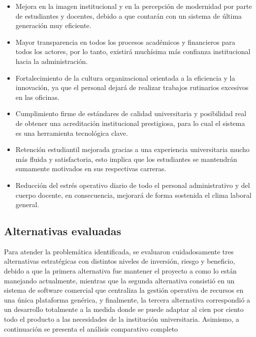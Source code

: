 \documentclass[11pt,spanish]{article}
\begin{document}
\begin{itemize}
    \item Mejora en la imagen institucional y en la percepción de modernidad por parte de estudiantes y docentes, debido a que contarán con un sistema de última generación muy eficiente.
    \item Mayor transparencia en todos los procesos académicos y financieros para todos los actores, por lo tanto, existirá muchísima más confianza institucional hacia la administración.
    \item Fortalecimiento de la cultura organizacional orientada a la eficiencia y la innovación, ya que el personal dejará de realizar trabajos rutinarios excesivos en las oficinas.
    \item Cumplimiento firme de estándares de calidad universitaria y posibilidad real de obtener una acreditación institucional prestigiosa, para lo cual el sistema es una herramienta tecnológica clave.
    \item Retención estudiantil mejorada gracias a una experiencia universitaria mucho más fluida y satisfactoria, esto implica que los estudiantes se mantendrán sumamente motivados en sus respectivas carreras.
    \item Reducción del estrés operativo diario de todo el personal administrativo y del cuerpo docente, en consecuencia, mejorará de forma sostenida el clima laboral general.
\end{itemize}

\subsection{Alternativas evaluadas}

Para atender la problemática identificada, se evaluaron cuidadosamente tres alternativas estratégicas con distintos niveles de inversión, riesgo y beneficio, debido a que la primera alternativa fue mantener el proyecto a como lo están manejando actualmente, mientras que la segunda alternativa consistió en un sistema de software comercial que centraliza la gestión operativa de recursos en una única plataforma genérica, y finalmente, la tercera alternativa correspondió a un desarrollo totalmente a la medida donde se puede adaptar al cien por ciento todo el producto a las necesidades de la institución universitaria. Asimismo, a continuación se presenta el análisis comparativo completo
\end{document}
